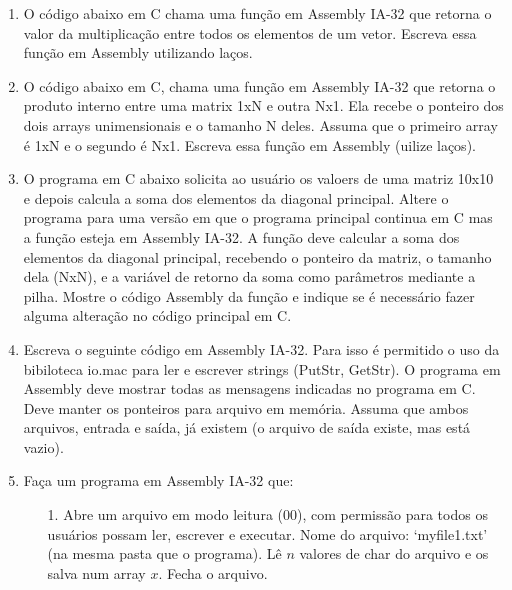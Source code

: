 \begin{enumerate}[resume]
    \begin{itemize}
        \item [(a)] 
        \item [(b)] 
        \item [(c)] 
        \item [(d)] 
    \end{itemize}

    \item   
    O código abaixo em C chama uma função em Assembly IA-32 que
    retorna o valor da multiplicação entre todos os elementos de um vetor.
    Escreva essa função em Assembly utilizando laços.

    \item
    O código abaixo em C, chama uma função em Assembly IA-32 que 
    retorna o produto interno entre uma matrix 1xN e outra Nx1.
    Ela recebe o ponteiro dos dois arrays unimensionais e o tamanho N deles.
    Assuma que o primeiro array é 1xN e o segundo é Nx1.
    Escreva essa função em Assembly (uilize laços).

    \item
    O programa em C abaixo solicita ao usuário os valoers de uma matriz 10x10
    e depois calcula a soma dos elementos da diagonal principal.
    Altere o programa para uma versão em que o programa principal continua em C
    mas a função  esteja em Assembly IA-32.
    A função deve calcular a soma dos elementos da diagonal principal,
    recebendo o ponteiro da matriz, o tamanho dela (NxN),
    e a variável de retorno da soma como parâmetros mediante a pilha.
    Mostre o código Assembly da função 
    e indique se é necessário fazer alguma alteração no código principal em C. 

    \item
    Escreva o seguinte código em Assembly IA-32.
    Para isso é permitido o uso da bibiloteca io.mac
    para ler e escrever strings (PutStr, GetStr).
    O programa em Assembly deve mostrar 
    todas as mensagens indicadas no programa em C.
    Deve manter os ponteiros para arquivo em memória.
    Assuma que ambos arquivos, entrada e saída, já existem 
    (o arquivo de saída existe, mas está vazio).

    \item
    Faça um programa em Assembly IA-32 que:
    \begin{enumerate}
        \item [1.]
        Abre um arquivo em modo leitura (00), 
        com permissão para todos os usuários 
        possam ler, escrever e executar. 
        Nome do arquivo: `myfile1.txt' (na mesma pasta que o programa). 
        Lê $n$ valores de char do arquivo e os salva num array $x$. 
        Fecha o arquivo.


\end{enumerate}
\end{enumerate}
